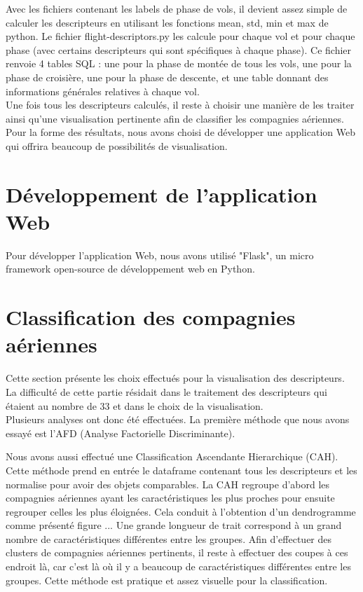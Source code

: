 Avec les fichiers contenant les labels de phase de vols, il devient assez simple de calculer les descripteurs en utilisant les fonctions mean, std, min et max de python. Le fichier flight-descriptors.py les calcule pour chaque vol et pour chaque phase (avec certains descripteurs qui sont spécifiques à chaque phase). Ce fichier renvoie 4 tables SQL : une pour la phase de montée de tous les vols, une pour la phase de croisière, une pour la phase de descente, et une table donnant des informations générales relatives à chaque vol. \\

Une fois tous les descripteurs calculés, il reste à choisir une manière de les traiter ainsi qu'une visualisation pertinente afin de classifier les compagnies aériennes. Pour la forme des résultats, nous avons choisi de développer une application Web qui offrira beaucoup de possibilités de visualisation. \\


\section*{Développement de l'application Web}

Pour développer l'application Web, nous avons utilisé "Flask", un micro framework open-source de développement web en Python. \\



\section*{Classification des compagnies aériennes}

Cette section présente les choix effectués pour la visualisation des descripteurs. La difficulté de cette partie résidait dans le traitement des descripteurs qui étaient au nombre de 33 et dans le choix de la visualisation. \\

Plusieurs analyses ont donc été effectuées. La première méthode que nous avons essayé est l'AFD (Analyse Factorielle Discriminante). 

Nous avons aussi effectué une Classification Ascendante Hierarchique (CAH). Cette méthode prend en entrée le dataframe contenant tous les descripteurs et les normalise pour avoir des objets comparables. La CAH regroupe d'abord les compagnies aériennes ayant les caractéristiques les plus proches pour ensuite regrouper celles les plus éloignées. Cela conduit à l'obtention d'un dendrogramme comme présenté figure ... Une grande longueur de trait correspond à un grand nombre de caractéristiques différentes entre les groupes. Afin d'effectuer des clusters de compagnies aériennes pertinents, il reste à effectuer des coupes à ces endroit là, car c'est là où il y a beaucoup de caractéristiques différentes entre les groupes. Cette méthode est pratique et assez visuelle pour la classification. \\

